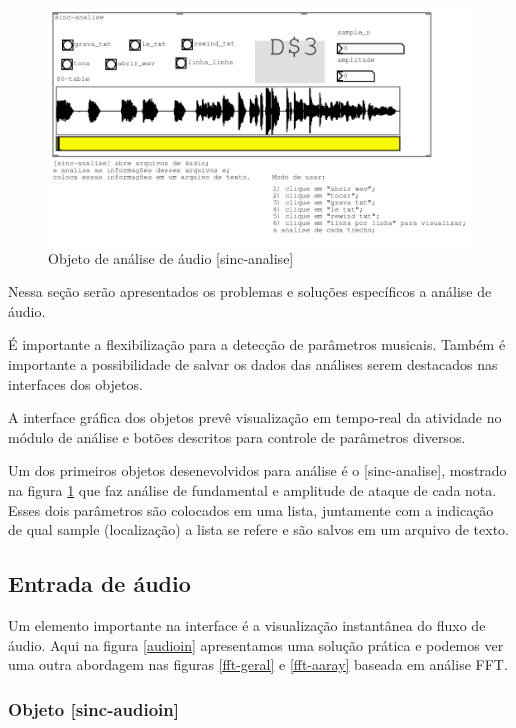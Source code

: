 \documentclass{ppgmus}
\begin{document}
\begin{figure}
\includegraphics[scale=.5]{sinc-analise}
\caption{Objeto de análise de áudio [sinc-analise]}
\label{sinc-analise}
\end{figure}


Nessa seção serão apresentados os problemas e soluções específicos
a análise de áudio. 

É importante a flexibilização para a detecção de parâmetros musicais.
Também é importante a possibilidade de salvar os dados das análises serem
destacados nas interfaces dos objetos.

A interface gráfica dos objetos prevê visualização em tempo-real
da atividade no módulo de análise e botões descritos para controle
de parâmetros diversos.

Um dos primeiros objetos desenevolvidos para análise é o [sinc-analise],
mostrado na figura \ref{sinc-analise} que faz análise de fundamental e amplitude
de ataque de cada nota. Esses dois parâmetros são colocados em uma lista, juntamente com a indicação
de qual sample (localização) a lista se refere e são salvos em um arquivo de texto.



\subsection{Entrada de áudio}

Um elemento importante na interface é a visualização instantânea
do fluxo de áudio. Aqui na figura \ref{audioin} apresentamos uma solução prática e podemos
ver uma outra abordagem nas figuras \ref{fft-geral} e \ref{fft-aaray} baseada em análise FFT.

\subsubsection{Objeto [sinc-audioin]}
\end{document}

